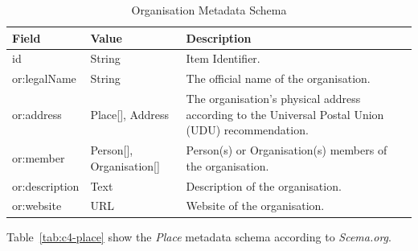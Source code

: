 \begin{longtable}{|p{}|p{}|p{}|}
    \caption{Organisation Metadata Schema} \label{tab:c4-organisation} \\
    \hline
    \textbf{Field} & \textbf{Value} & \textbf{Description} \\
    \hline

    \scriptsize id                      & \scriptsize String                                            &  \scriptsize Item Identifier. \\
    \hline
    \scriptsize or:legalName             & \scriptsize String                                            &  \scriptsize The official name of the organisation. \\
    \hline
    \scriptsize or:address               & \scriptsize \textcolor{uniudColor3}{Place}[], Address         &  \scriptsize The organisation's physical address according to the Universal Postal Union (UDU) recommendation. \\
    \hline
    \scriptsize or:member                & \scriptsize \textcolor{uniudColor3}{Person}[], \textcolor{uniudColor3}{Organisation}[] &  \scriptsize Person(s) or Organisation(s) members of the organisation. \\
    \hline
    \scriptsize or:description           & \scriptsize Text                                             &  \scriptsize Description of the organisation. \\
    \hline
    \scriptsize or:website                 & \scriptsize URL                                              & \scriptsize  Website of the organisation. \\
    \hline

\end{longtable}

Table~\ref{tab:c4-place} show the \textit{Place} metadata schema according to \textit{Scema.org}. 

